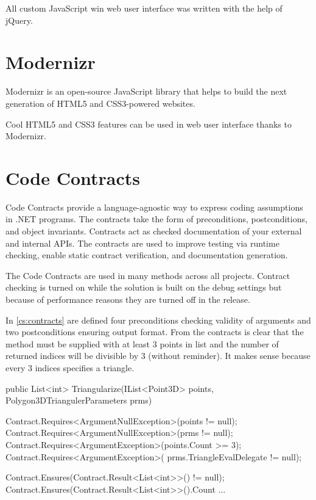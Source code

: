 All custom JavaScript win web user interface was written with the help of jQuery.


\section{Modernizr}
\label{sec:Modernizr}

\noindent
Modernizr is an open-source JavaScript library that helps to build the next generation of HTML5 and CSS3-powered websites.

Cool HTML5 and CSS3 features can be used in web user interface thanks to Modernizr.


\section{Code Contracts}
\label{sec:CodeContracts}

\noindent
Code Contracts provide a language-agnostic way to express coding assumptions in .NET programs.
The contracts take the form of preconditions, postconditions, and object invariants.
Contracts act as checked documentation of your external and internal APIs.
The contracts are used to improve testing via runtime checking, enable static contract verification, and documentation generation.

The Code Contracts are used in many methods across all projects.
Contract checking is turned on while the solution is built on the debug settings but because of performance reasons they are turned off in the release.

In \autoref{cs:contracts} are defined four preconditions checking validity of arguments and two postconditions ensuring output format.
From the contracts is clear that the method must be supplied with at least 3 points in list and the number of returned indices will be divisible by 3 (without reminder).
It makes sense because every 3 indices specifies a triangle.


\begin{Csharp}[label=cs:contracts,caption={Example of code contracts in the \emph{Triangularize} method of the \emph{Polygon3DTrianguler} class.}]
public List<int> Triangularize(IList<Point3D> points,
		Polygon3DTriangulerParameters prms) {
		
	Contract.Requires<ArgumentNullException>(points != null);
	Contract.Requires<ArgumentNullException>(prms != null);
	Contract.Requires<ArgumentException>(points.Count >= 3);
	Contract.Requires<ArgumentException>(
		prms.TriangleEvalDelegate != null);
		
	Contract.Ensures(Contract.Result<List<int>>() != null);
	Contract.Ensures(Contract.Result<List<int>>().Count %
	...	
}
\end{Csharp}



